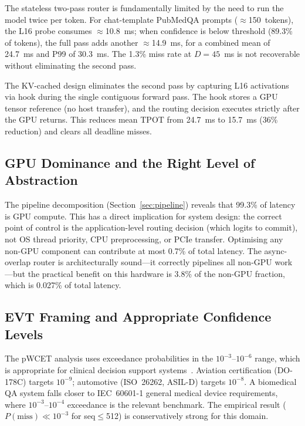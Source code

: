 \documentclass[conference]{IEEEtran}
\begin{document}
The stateless two-pass router is fundamentally limited by the need
to run the model twice per token.
For chat-template PubMedQA prompts ($\approx$150~tokens), the L16
probe consumes $\approx$10.8~ms; when confidence is below threshold
(89.3\% of tokens), the full pass adds another $\approx$14.9~ms,
for a combined mean of 24.7~ms and P99 of 30.3~ms.
The 1.3\% miss rate at $D=45$~ms is not recoverable without
eliminating the second pass.

The KV-cached design eliminates the second pass by capturing L16
activations via hook during the single contiguous forward pass.
The hook stores a GPU tensor reference (no host transfer), and the
routing decision executes strictly after the GPU returns.
This reduces mean TPOT from 24.7~ms to 15.7~ms (36\% reduction)
and clears all deadline misses.

\subsection{GPU Dominance and the Right Level of Abstraction}

The pipeline decomposition (Section~\ref{sec:pipeline}) reveals that
99.3\% of latency is GPU compute.
This has a direct implication for system design: the correct point
of control is the application-level routing decision (which logits
to commit), not OS thread priority, CPU preprocessing, or PCIe transfer.
Optimising any non-GPU component can contribute at most 0.7\% of
total latency.
The async-overlap router is architecturally sound---it correctly
pipelines all non-GPU work---but the practical benefit on this
hardware is 3.8\% of the non-GPU fraction, which is 0.027\% of
total latency.

\subsection{EVT Framing and Appropriate Confidence Levels}

The pWCET analysis uses exceedance probabilities in the
$10^{-3}$--$10^{-6}$ range, which is appropriate for clinical
decision support systems~\cite{singhal2023large}.
Aviation certification (DO-178C) targets $10^{-9}$; automotive
(ISO~26262, ASIL-D) targets $10^{-8}$.
A biomedical QA system falls closer to IEC~60601-1 general medical
device requirements, where $10^{-3}$--$10^{-4}$ exceedance is the
relevant benchmark.
The empirical result ($P(\text{miss}) \ll 10^{-3}$ for seq$\leq$512)
is conservatively strong for this domain.
\end{document}
